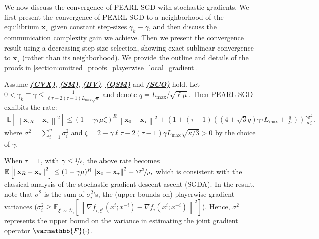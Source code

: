\documentclass{article}
\newcommand{\algname}[1]{{\color{PineGreen}\sf  #1}\xspace}
\newcommand{\vx}{{\mathbf{x}}}
\newcommand{\cD}{{\mathcal{D}}}
\newcommand{\opF}{{\varmathbb{F}}}
\newcommand{\sqnorm}[1]{\left\| #1 \right\|^2}
\newcommand{\abbvname}{\algname{PEARL-SGD}}
\theoremstyle{plain}
\theoremstyle{remark}
\begin{document}
We now discuss the convergence of \abbvname with stochastic gradients. 
We first present the convergence of \abbvname to a neighborhood of the equilibrium $\vx_\star$ given constant step-sizes $\gamma_k \equiv \gamma$, and then discuss the communication complexity gain we achieve.
Then we present the convergence result using a decreasing step-size selection, showing exact sublinear convergence to $\vx_\star$ (rather than its neighborhood).
We provide the outline and details of the proofs in \cref{section:omitted_proofs_playerwise_local_gradient}.

\begin{theorem}
\label{theorem:stochastic-local-GDA}
Assume \hyperref[assumption:convexity]{\textbf{\emph{(CVX)}}}, \hyperref[assumption:smoothness]{\textbf{\emph{(SM)}}}, \hyperref[assumption:noise]{\textbf{\emph{(BV)}}}, \hyperref[assumption:quasi-strong-monotonicity]{\textbf{\emph{(QSM)}}} and \hyperref[assumption:star-cocoercivity]{\textbf{\emph{(SCO)}}} hold. 
Let $0 < \gamma_k \equiv \gamma \le \frac{1}{\ell\tau + 2(\tau - 1) L_{\mathrm{max}} \sqrt{\kappa}}$ and denote $q = L_\mathrm{max}/\sqrt{\ell\mu}$.
Then \abbvname exhibits the rate:
\begin{align*}
    \mathbb{E}\left[\sqnorm{\vx_{\tau R} - \vx_\star}\right] \le \left( 1 - \gamma\tau\mu \zeta \right)^R \sqnorm{\vx_0 - \vx_\star} + \left( 1 + (\tau - 1) \left( (4+\sqrt{3}q)\gamma\tau L_{\mathrm{max}} + \frac{q}{2\tau} \right) \right) \frac{\gamma\sigma^2}{\mu\zeta} .
\end{align*}
where $\sigma^2 = \sum_{i=1}^n \sigma_i^2$ and $\zeta = 2 - \gamma \ell\tau - 2(\tau - 1)\gamma L_{\mathrm{max}} \sqrt{\kappa/3} > 0$ by the choice of $\gamma$.
\end{theorem}

When $\tau = 1$, with $\gamma \le \nicefrac{1}{\ell}$, the above rate becomes 
$\mathbb{E}\left[ \sqnorm{\vx_R - \vx_\star} \right] \le (1-\gamma\mu)^R \sqnorm{\vx_0 - \vx_\star} + \nicefrac{\gamma\sigma^2}{\mu},$ 
which is consistent with the classical analysis of the stochastic gradient descent-ascent (SGDA).
In the result, note that $\sigma^2$ is the sum of $\sigma_i^2$'s, the (upper bounds on) playerwise gradient variances ($\sigma_i^2 \ge \mathbb{E}_{\xi^i \sim \cD_i} \left[ \sqnorm{\nabla f_{i,\xi^i} (x^i; x^{-i}) - \nabla f_i (x^i; x^{-i})} \right]$).
Hence, $\sigma^2$ represents the upper bound on the variance in estimating the joint gradient operator $\opF(\cdot)$.
\end{document}
